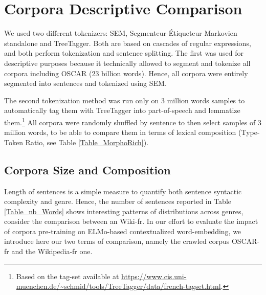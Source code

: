 \section{Corpora Descriptive Comparison} \label{sec:CompareCorpora}

We used two different tokenizers: SEM, Segmenteur-Étiqueteur Markovien standalone \citet{dupont-2017-exploration} and TreeTagger. Both are based on cascades of regular expressions, and both perform tokenization and sentence splitting.
The first was used for descriptive purposes because it technically allowed to segment and tokenize all corpora including OSCAR (23 billion words). Hence, all corpora were entirely segmented into sentences and tokenized using SEM.

The second tokenization method was run only on 3 million words samples to automatically tag them with TreeTagger into part-of-speech and lemmatize them.\footnote{Based on the tag-set available at \url{https://www.cis.uni-muenchen.de/~schmid/tools/TreeTagger/data/french-tagset.html}.} All corpora were randomly shuffled by sentence to then select samples of 3 million words, to be able to compare them in terms of lexical composition (Type-Token Ratio, see Table \ref{Table_MorphoRich}).

\subsection{Corpora Size and Composition}

Length of sentences is a simple measure to quantify both sentence syntactic complexity and genre. Hence, the number of sentences reported in Table \ref{Table_nb_Words} shows interesting patterns of distributions across genres, consider the comparison between \Cabernet an Wiki-fr.
In our effort to evaluate the impact of corpora pre-training on ELMo-based contextualized word-embedding, we introduce here our two terms of comparison, namely the crawled corpus OSCAR-fr and the Wikipedia-fr one.

